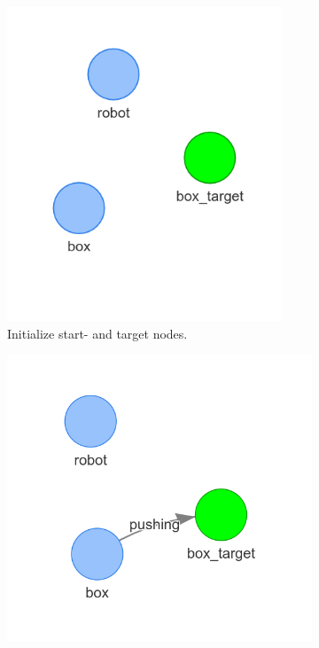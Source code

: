 \begin{figure}[h]
    \centering
    \begin{subfigure}{.3\textwidth}
    \centering
    \includegraphics[width=0.9\textwidth]{figures/proposed_method/connecting_nodes/robot_push/robot_push_1}
    \caption{Initialize start- and target nodes.}\label{subfig:robot_push_1}
    \end{subfigure}
    \begin{subfigure}{.32\textwidth}
    \centering
    \includegraphics[width=\textwidth]{figures/proposed_method/connecting_nodes/robot_push/robot_push_2_new}

\end{subfigure}
\end{figure}
